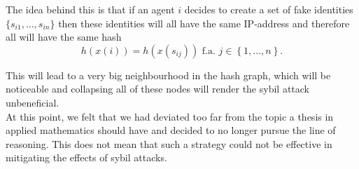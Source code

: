\noindent{}The idea behind this is that if an agent $i$ decides to create a set of fake identities $\{s_{i1},\ldots,s_{in}\}$ then these identities will all have the same IP-address and therefore all will have the same hash 
\[
h(x(i))=h(x(s_{ij}))\,\, \text{f.a.}\,\, j\in\left\lbrace{}1,\ldots,n\right\rbrace .
\]

\noindent{}This will lead to a very big neighbourhood in the hash graph, which will be noticeable and collapsing all of these nodes will render the sybil attack unbeneficial. \vspace{1em}\\

\noindent{}At this point, we felt that we had deviated too far from the topic a thesis in applied mathematics should have and decided to no longer pursue the line of reasoning. This does not mean that such a strategy could not be effective in mitigating the effects of sybil attacks.\vspace{1em}\\